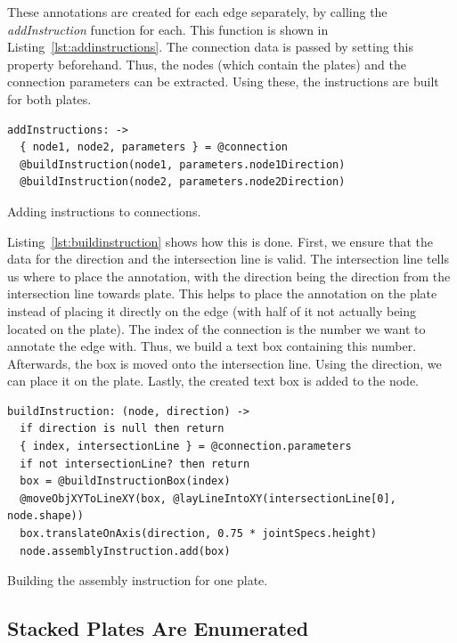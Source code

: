 \documentclass[../ClassicThesis.tex]{subfiles}
\begin{document}
These annotations are created for each edge separately, by calling the \emph{addInstruction} function for each. This function is shown in Listing~\ref{lst:addinstructions}. The connection data is passed by setting this property beforehand. Thus, the nodes (which contain the plates) and the connection parameters can be extracted. Using these, the instructions are built for both plates.

\begin{listing}
\begin{verbatim}
addInstructions: ->
  { node1, node2, parameters } = @connection
  @buildInstruction(node1, parameters.node1Direction)
  @buildInstruction(node2, parameters.node2Direction)
\end{verbatim}
\caption{Adding instructions to connections.}
\label{lst:addinstructions}
\end{listing}

Listing~\ref{lst:buildinstruction} shows how this is done. First, we ensure that the data for the direction and the intersection line is valid. The intersection line tells us where to place the annotation, with the direction being the direction from the intersection line towards plate. This helps to place the annotation on the plate instead of placing it directly on the edge (with half of it not actually being located on the plate). The index of the connection is the number we want to annotate the edge with. Thus, we build a text box containing this number. Afterwards, the box is moved onto the intersection line. Using the direction, we can place it on the plate. Lastly, the created text box is added to the node.

\begin{listing}
\begin{verbatim}
buildInstruction: (node, direction) ->
  if direction is null then return
  { index, intersectionLine } = @connection.parameters
  if not intersectionLine? then return 
  box = @buildInstructionBox(index)
  @moveObjXYToLineXY(box, @layLineIntoXY(intersectionLine[0], node.shape))
  box.translateOnAxis(direction, 0.75 * jointSpecs.height)
  node.assemblyInstruction.add(box)
\end{verbatim}
\caption{Building the assembly instruction for one plate.}
\label{lst:buildinstruction}
\end{listing}

\subsection{Stacked Plates Are Enumerated}\label{sub:assemblystacked}
\end{document}
